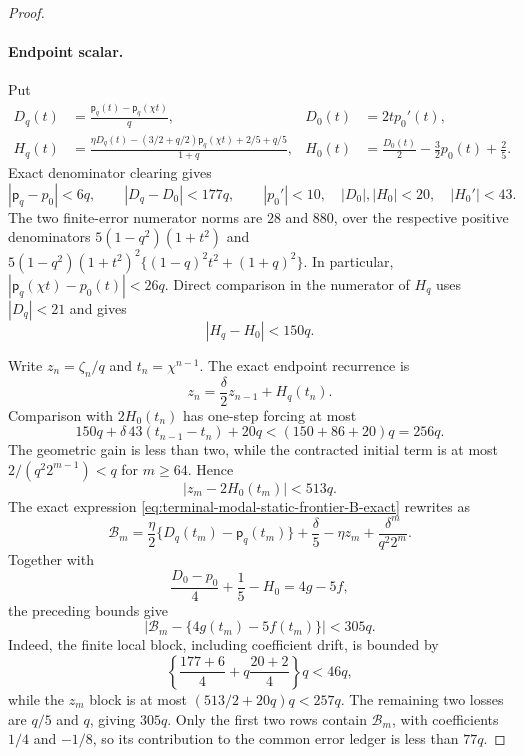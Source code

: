 \begin{proof}
\paragraph{Endpoint scalar.}
Put
\begin{align*}
 D_q(t)&=\frac{\mathsf p_q(t)-\mathsf p_q(\chi t)}q,
 &D_0(t)&=2tp_0'(t),\\
 H_q(t)&=\frac{\eta D_q(t)-(3/2+q/2)\mathsf p_q(\chi t)+2/5+q/5}
 {1+q},
 &H_0(t)&=\frac{D_0(t)}2-\frac32p_0(t)+\frac25.
\end{align*}
Exact denominator clearing gives
\begin{equation}
 |\mathsf p_q-p_0|<6q,\qquad |D_q-D_0|<177q,\qquad
 |p_0'|<10,\quad |D_0|,|H_0|<20,\quad |H_0'|<43.
 \label{eq:terminal-modal-frontier-cutoff-endpoint-local}
\end{equation}
The two finite-error numerator norms are $28$ and $880$, over the respective
positive denominators
$5(1-q^2)(1+t^2)$ and
$5(1-q^2)(1+t^2)^2\{(1-q)^2t^2+(1+q)^2\}$.
In particular,
$|\mathsf p_q(\chi t)-p_0(t)|<26q$.  Direct comparison in the numerator of
$H_q$ uses $|D_q|<21$ and gives
\begin{equation}
 |H_q-H_0|<150q.
 \label{eq:terminal-modal-frontier-cutoff-H-error}
\end{equation}

Write $z_n=\zeta_n/q$ and $t_n=\chi^{n-1}$.  The exact endpoint recurrence
is
\[
 z_n=\frac\delta2z_{n-1}+H_q(t_n).
\]
Comparison with $2H_0(t_n)$ has one-step forcing at most
\[
 150q+\delta\,43(t_{n-1}-t_n)+20q
 <(150+86+20)q=256q.
\]
The geometric gain is less than two, while the contracted initial term is
at most $2/(q^2 2^{m-1})<q$ for $m\ge64$.  Hence
\begin{equation}
 |z_m-2H_0(t_m)|<513q.
 \label{eq:terminal-modal-frontier-cutoff-zeta-error}
\end{equation}
The exact expression \eqref{eq:terminal-modal-static-frontier-B-exact}
rewrites as
\[
 \mathcal B_m=\frac\eta2\{D_q(t_m)-\mathsf p_q(t_m)\}
 +\frac\delta5-\eta z_m+\frac{\delta^m}{q^2 2^m}.
\]
Together with
\[
 \frac{D_0-p_0}{4}+\frac15-H_0=4g-5f,
\]
the preceding bounds give
\begin{equation}
 |\mathcal B_m-\{4g(t_m)-5f(t_m)\}|<305q.
 \label{eq:terminal-modal-frontier-cutoff-B-error}
\end{equation}
Indeed, the finite local block, including coefficient drift, is bounded by
\[
 \left\{\frac{177+6}{4}+q\frac{20+2}{4}\right\}q<46q,
\]
while the $z_m$ block is at most
$(513/2+20q)q<257q$.  The remaining two losses are $q/5$ and $q$, giving
$305q$.  Only the first two rows contain $\mathcal B_m$, with coefficients
$1/4$ and $-1/8$, so its contribution to the common error ledger is less
than $77q$.


\end{proof}
